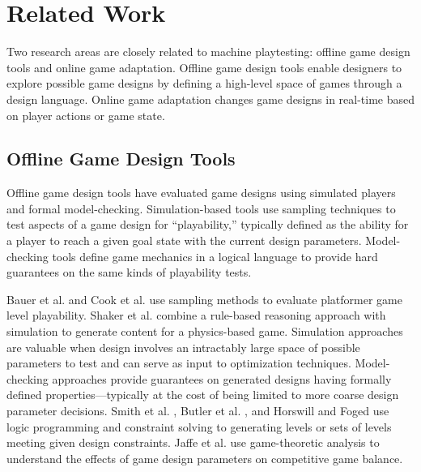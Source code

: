 \documentclass{sig-alternate}
\begin{document}

\section{Related Work}

Two research areas are closely related to machine playtesting: offline game design tools and online game adaptation.
Offline game design tools enable designers to explore possible game designs by defining a high-level space of games through a design language.
Online game adaptation changes game designs in real-time based on player actions or game state.



\subsection{Offline Game Design Tools}
Offline game design tools have evaluated game designs using simulated players and formal model-checking.
Simulation-based tools use sampling techniques to test aspects of a game design for ``playability,'' typically defined as the ability for a player to reach a given goal state with the current design parameters.
Model-checking tools define game mechanics in a logical language to provide hard guarantees on the same kinds of playability tests.

Bauer et al. \cite{bauer2013:rrt-generation} and Cook et al. \cite{cook2012:coopcoevo} use sampling methods to evaluate platformer game level playability.
Shaker et al. \cite{shaker2013:ropossum-test} combine a rule-based reasoning approach with simulation to generate content for a physics-based game.
Simulation approaches are valuable when design involves an intractably large space of possible parameters to test and can serve as input to optimization techniques.
%
Model-checking approaches provide guarantees on generated designs having formally defined properties---typically at the cost of being limited to more coarse design parameter decisions.
Smith et al. \cite{smith2013:quantify-play}, Butler et al. \cite{butler2013:progression-tool}, and Horswill and Foged \cite{horswill2012:levelgen} use logic programming and constraint solving to generating levels or sets of levels meeting given design constraints.
Jaffe et al. \cite{jaffe2012:balance} use game-theoretic analysis to understand the effects of game design parameters on competitive game balance.
\end{document}
